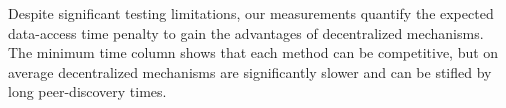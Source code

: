 \documentclass[10pt,twocolumn,letterpaper]{article}
\begin{document}
Despite significant testing limitations, our measurements quantify the expected data-access time penalty to
  gain the advantages of decentralized mechanisms.
The minimum time column shows that each method can be competitive, but on average decentralized
  mechanisms are significantly slower and can be stifled by long peer-discovery times.
  







\end{document}
